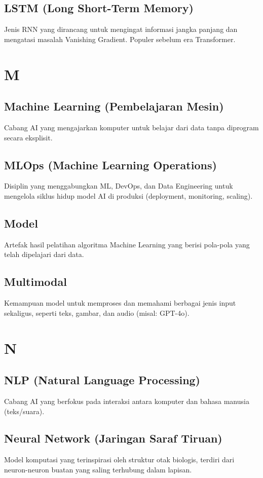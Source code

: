 \subsection*{LSTM (Long Short-Term Memory)}
Jenis RNN yang dirancang untuk mengingat informasi jangka panjang dan mengatasi masalah Vanishing Gradient. Populer sebelum era Transformer.

\section*{M}

\subsection*{Machine Learning (Pembelajaran Mesin)}
Cabang AI yang mengajarkan komputer untuk belajar dari data tanpa diprogram secara eksplisit.

\subsection*{MLOps (Machine Learning Operations)}
Disiplin yang menggabungkan ML, DevOps, dan Data Engineering untuk mengelola siklus hidup model AI di produksi (deployment, monitoring, scaling).

\subsection*{Model}
Artefak hasil pelatihan algoritma Machine Learning yang berisi pola-pola yang telah dipelajari dari data.

\subsection*{Multimodal}
Kemampuan model untuk memproses dan memahami berbagai jenis input sekaligus, seperti teks, gambar, dan audio (misal: GPT-4o).

\section*{N}

\subsection*{NLP (Natural Language Processing)}
Cabang AI yang berfokus pada interaksi antara komputer dan bahasa manusia (teks/suara).

\subsection*{Neural Network (Jaringan Saraf Tiruan)}
Model komputasi yang terinspirasi oleh struktur otak biologis, terdiri dari neuron-neuron buatan yang saling terhubung dalam lapisan.

